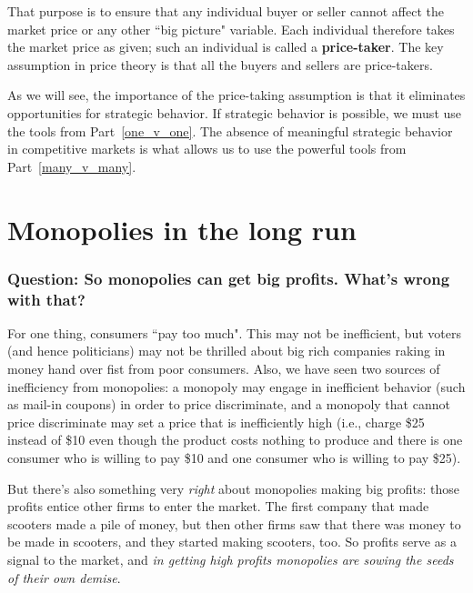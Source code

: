 That purpose is to ensure that any individual buyer or seller cannot affect the market price or any other ``big picture" variable. Each individual therefore takes the market price as given; such an individual is called a \textbf{price-taker}. The key assumption in price theory is that all the buyers and sellers are price-takers.

As we will see, the importance of the price-taking assumption is that it eliminates opportunities for strategic behavior. If strategic behavior is possible, we must use the tools from Part~\ref{one_v_one}. The absence of meaningful strategic behavior in competitive markets is what allows us to use the powerful tools from Part~\ref{many_v_many}.



\section{Monopolies in the long run}


\subsubsection{Question: \rm So monopolies can get big profits. What's wrong with that?}

For one thing, consumers ``pay too much". This may not be inefficient, but voters (and hence politicians) may not be thrilled about big rich companies raking in money hand over fist from poor consumers. Also, we have seen two sources of inefficiency from monopolies: a monopoly may engage in inefficient behavior (such as mail-in coupons) in order to price discriminate, and a monopoly that cannot price discriminate may set a price that is inefficiently high (i.e., charge \$25 instead of \$10 even though the product costs nothing to produce and there is one consumer who is willing to pay \$10 and one consumer who is willing to pay \$25).

But there's also something very \emph{right} about monopolies making big profits: those profits entice other firms to enter the market. The first company that made scooters made a pile of money, but then other firms saw that there was money to be made in scooters, and they started making scooters, too. So profits serve as a signal to the market, and \textit{in getting high profits monopolies are sowing the seeds of their own demise}.

